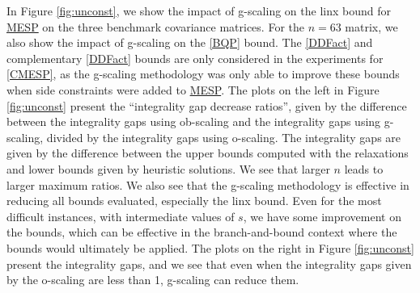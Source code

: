 \documentclass[smallextended]{svjour3hack}       %
\begin{document}
{In Figure \ref{fig:unconst}, we show the impact of  g-scaling on the  linx bound for \hyperlink{MESP}{MESP} on the three benchmark covariance matrices. For  the $n=63$ matrix, we also show the impact of  g-scaling on the \ref{BQP} bound. The \ref{DDFact} and complementary \ref{DDFact} bounds are only considered in the experiments for \ref{CMESP}, as the g-scaling methodology was only able to improve these bounds when side constraints were added to \hyperlink{MESP}{MESP}.
The plots on the left in Figure \ref{fig:unconst} present the ``integrality gap decrease ratios'', given by the difference between the integrality gaps using ob-scaling and the integrality gaps using g-scaling, divided by the  integrality gaps using o-scaling.
The integrality gaps are given by the difference between the upper bounds computed with the relaxations and
     lower bounds given by heuristic solutions. We see that larger  $n$ leads to larger  maximum ratios. We also see that the g-scaling methodology is effective in reducing all bounds evaluated, especially the linx bound. Even for the most difficult instances, with intermediate values of $s$, we have some improvement on the bounds, which can be  effective in the branch-and-bound context where the bounds would ultimately be applied. The plots on the right in Figure \ref{fig:unconst} present the integrality gaps, and we see that even when the integrality gaps given by the o-scaling are less than 1,  g-scaling can reduce them.





}
\end{document}
